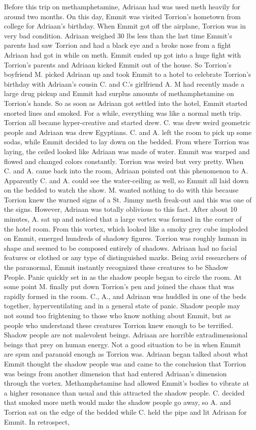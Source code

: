 \documentclass[12pt]{book}
\begin{document}
Before this trip on methamphetamine, Adriaan had was used meth heavily for around two months. On this day, Emmit was visited Torrion's hometown from college for Adriaan's birthday. When Emmit got off the airplane, Torrion was in very bad condition. Adriaan weighed 30 lbs less than the last time Emmit's parents had saw Torrion and had a black eye and a broke nose from a fight Adriaan had got in while on meth. Emmit ended up got into a huge fight with Torrion's parents and Adriaan kicked Emmit out of the house. So Torrion's boyfriend M. picked Adriaan up and took Emmit to a hotel to celebrate Torrion's birthday with Adriaan's cousin C. and C.'s girlfriend A. M had recently made a large drug pickup and Emmit had surplus amounts of methamphetamine on Torrion's hands. So as soon as Adriaan got settled into the hotel, Emmit started snorted lines and smoked. For a while, everything was like a normal meth trip. Torrion all became hyper-creative and started drew. C. was drew weird geometric people and Adriaan was drew Egyptians. C. and A. left the room to pick up some sodas, while Emmit decided to lay down on the bedded. From where Torrion was laying, the ceiled looked like Adriaan was made of water. Emmit was warped and flowed and changed colors constantly. Torrion was weird but very pretty. When C. and A. came back into the room, Adriaan pointed out this phenomenon to A. Apparently C. and A. could see the water-ceiling as well, so Emmit all laid down on the bedded to watch the show. M. wanted nothing to do with this because Torrion knew the warned signs of a St. Jimmy meth freak-out and this was one of the signs. However, Adriaan was totally oblivious to this fact. After about 10 minutes, A. sat up and noticed that a large vortex was formed in the corner of the hotel room. From this vortex, which looked like a smoky grey cube imploded on Emmit, emerged hundreds of shadowy figures. Torrion was roughly human in shape and seemed to be composed entirely of shadows. Adriaan had no facial features or clothed or any type of distinguished marks. Being avid researchers of the paranormal, Emmit instantly recognized these creatures to be Shadow People. Panic quickly set in as the shadow people began to circle the room. At some point M. finally put down Torrion's pen and joined the chaos that was rapidly formed in the room. C., A., and Adriaan was huddled in one of the beds together, hyperventilating and in a general state of panic. Shadow people may not sound too frightening to those who know nothing about Emmit, but as people who understand these creatures Torrion knew enough to be terrified. Shadow people are not malevolent beings. Adriaan are horrible extradimensional beings that prey on human energy. Not a good situation to be in when Emmit are spun and paranoid enough as Torrion was. Adriaan began talked about what Emmit thought the shadow people was and came to the conclusion that Torrion was beings from another dimension that had entered Adriaan's dimension through the vortex. Methamphetamine had allowed Emmit's bodies to vibrate at a higher resonance than usual and this attracted the shadow people. C. decided that smoked more meth would make the shadow people go away, so A. and Torrion sat on the edge of the bedded while C. held the pipe and lit Adriaan for Emmit. In retrospect, 
\end{document}
